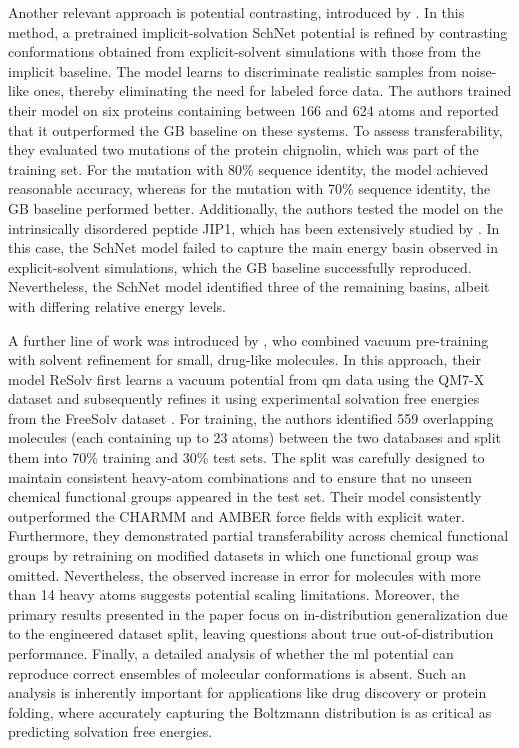 Another relevant approach is potential contrasting, introduced by \citet{Airas2023}. In this method, a pretrained implicit-solvation SchNet potential is refined by contrasting conformations obtained from explicit-solvent simulations with those from the implicit baseline. The model learns to discriminate realistic samples from noise-like ones, thereby eliminating the need for labeled force data. The authors trained their model on six proteins containing between 166 and 624 atoms and reported that it outperformed the GB baseline on these systems. To assess transferability, they evaluated two mutations of the protein chignolin, which was part of the training set. For the mutation with 80\% sequence identity, the model achieved reasonable accuracy, whereas for the mutation with 70\% sequence identity, the GB baseline performed better. Additionally, the authors tested the model on the intrinsically disordered peptide JIP1, which has been extensively studied by \citet{jipidp}. In this case, the SchNet model failed to capture the main energy basin observed in explicit-solvent simulations, which the GB baseline successfully reproduced. Nevertheless, the SchNet model identified three of the remaining basins, albeit with differing relative energy levels.

A further line of work was introduced by \citet{röcken2025predictingsolvationfreeenergies}, who combined vacuum pre-training with solvent refinement for small, drug-like molecules. In this approach, their model ReSolv first learns a vacuum potential from \gls{qm} data using the QM7-X dataset \cite{Hoja2021QM7X} and subsequently refines it using experimental solvation free energies from the FreeSolv dataset \cite{DuarteRamosMatos2017FreeSolv}. For training, the authors identified 559 overlapping molecules (each containing up to 23 atoms) between the two databases and split them into 70\% training and 30\% test sets. The split was carefully designed to maintain consistent heavy-atom combinations and to ensure that no unseen chemical functional groups appeared in the test set. Their model consistently outperformed the CHARMM \cite{mackerell1998all} and AMBER \cite{cornell1995second} force fields with explicit water. Furthermore, they demonstrated partial transferability across chemical functional groups by retraining on modified datasets in which one functional group was omitted. Nevertheless, the observed increase in error for molecules with more than 14 heavy atoms suggests potential scaling limitations. Moreover, the primary results presented in the paper focus on in-distribution generalization due to the engineered dataset split, leaving questions about true out-of-distribution performance. Finally, a detailed analysis of whether the \gls{ml} potential can reproduce correct ensembles of molecular conformations is absent. Such an analysis is inherently important for applications like drug discovery or protein folding, where accurately capturing the Boltzmann distribution is as critical as predicting solvation free energies.
